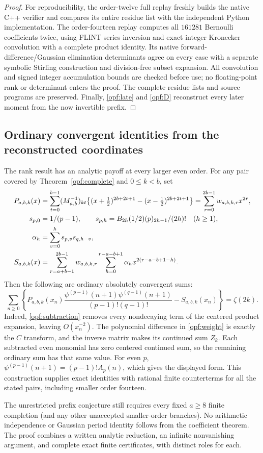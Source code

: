 \begin{proof}
For reproducibility, the order-twelve full replay freshly builds
the native C++ verifier and compares its entire residue list with
the independent Python implementation. The order-fourteen replay
computes all $161281$ Bernoulli coefficients twice, using FLINT
series inversion and exact integer Kronecker convolution with a
complete product identity. Its native forward-difference/Gaussian
elimination determinants agree on every case with a separate
symbolic Stirling construction and division-free subset expansion.
All convolution and signed integer accumulation bounds are checked
before use; no floating-point rank or determinant enters the proof.
The complete residue lists and source programs are preserved.
Finally, \eqref{opf:late} and \eqref{opf:D} reconstruct every later
moment from the now invertible prefix.
\end{proof}

\subsection{Ordinary convergent identities from the reconstructed coordinates}

The rank result has an analytic payoff at every larger even order.
For any pair covered by Theorem~\ref{opf:complete} and $0\le k<b$, set
\begin{align}
 P_{a,b,k}(x)&=\sum_{t=0}^{b-1}(M_{a,b}^{-1})_{kt}
 \bigl\{(x+\tfrac12)^{2b+2t+1}-(x-\tfrac12)^{2b+2t+1}\bigr\}
 =\sum_{r=0}^{2b-1}w_{a,b,k,r}x^{2r},\label{opf:weight}\\
 s_{p,0}&=1/(p-1),\qquad
 s_{p,h}=B_{2h}(1/2)(p)_{2h-1}/(2h)!\quad(h\ge1),\notag\\
 \alpha_h&=\sum_{v=0}^h s_{p,v}s_{q,h-v},\notag\\
 S_{a,b,k}(x)&=\sum_{r=a+b-1}^{2b-1}w_{a,b,k,r}
           \sum_{h=0}^{r-a-b+1}\alpha_h x^{2(r-a-b+1-h)}.
 \label{opf:subtraction}
\end{align}
Then the following are ordinary absolutely convergent sums:
\begin{equation}\label{opf:ordinary}
 \boxed{\sum_{n\ge0}\left\{
 P_{a,b,k}(x_n)\frac{\psi^{(p-1)}(n+1)\psi^{(q-1)}(n+1)}
                         {(p-1)!(q-1)!}-S_{a,b,k}(x_n)
                    \right\}=\zeta(2k).}
\end{equation}
Indeed, \eqref{opf:subtraction} removes every nondecaying term
of the centered product expansion, leaving $O(x_n^{-2})$.
The polynomial difference in \eqref{opf:weight} is exactly the
$C$ transform, and the inverse matrix makes its continued sum $Z_k$.
Each subtracted even monomial has zero centered continued sum,
so the remaining ordinary sum has that same value. For even $p$,
$\psi^{(p-1)}(n+1)=(p-1)!A_p(n)$, which gives the displayed form.
This construction supplies exact identities with rational finite
counterterms for all the stated pairs, including smaller order fourteen.

The unrestricted prefix conjecture still requires every fixed
$a\ge8$ finite completion (and any other unaccepted smaller-order
branches). No arithmetic independence or Gaussian period identity
follows from the coefficient theorem. The proof combines a written
analytic reduction, an infinite nonvanishing argument, and complete
exact finite certificates, with distinct roles for each.
